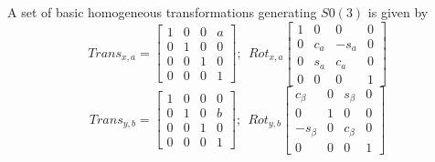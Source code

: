 A set of basic homogeneous transformations generating $S0(3)$ is given by
 \begin{equation}\label{transx}
   Trans_{x,a}=\left[\begin{array}{cccc}
                       1 & 0 & 0 & a \\
                       0 & 1 & 0 & 0 \\
                       0 & 0 & 1 & 0 \\
                       0 & 0 & 0 & 1 \end{array}\right];\ \ Rot_{x,a}\left[\begin{array}{cccc}
                                                                            1 & 0 & 0 & 0 \\
                                                                            0 & c_a & -s_a & 0 \\
                                                                            0 & s_a & c_a & 0 \\
                                                                            0 & 0 & 0 & 1 \end{array}\right]
 \end{equation}
 \begin{equation}\label{transx}
   Trans_{y,b}=\left[\begin{array}{cccc}
                       1 & 0 & 0 & 0 \\
                       0 & 1 & 0 & b \\
                       0 & 0 & 1 & 0 \\
                       0 & 0 & 0 & 1 \end{array}\right];\ \ Rot_{y,b}\left[\begin{array}{cccc}
                                                                            c_\beta & 0 & s_\beta & 0 \\
                                                                            0 & 1 & 0 & 0 \\
                                                                            -s_\beta & 0 & c_\beta & 0 \\
                                                                            0 & 0 & 0 & 1 \end{array}\right]
 \end{equation}
